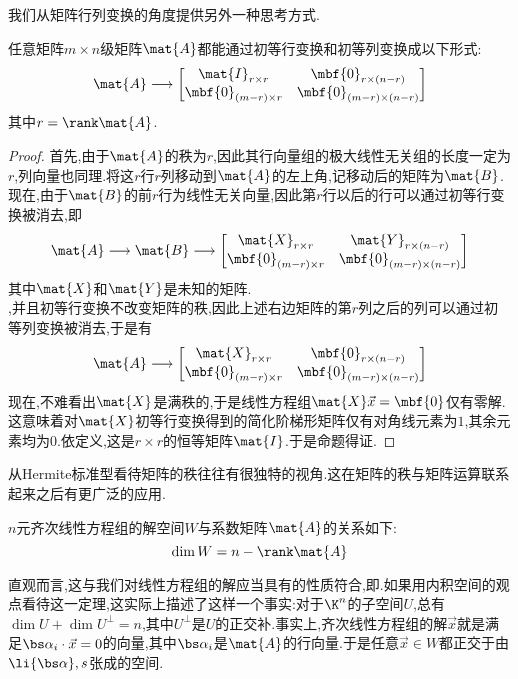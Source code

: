 \documentclass{ctexart}
\begin{document}
{\color{darkgreen}我们从矩阵行列变换的角度提供另外一种思考方式.
\begin{definition}[Hermite标准型]
    任意矩阵$m\times n$级矩阵$\mat{A}$都能通过初等行变换和初等列变换成以下形式:
    \[\mat{A}\longrightarrow\begin{bmatrix}
        \mat{I}_{r\times r}&\mbf{0}_{r\times(n-r)}\\
        \mbf{0}_{(m-r)\times r}&\mbf{0}_{(m-r)\times(n-r)}
    \end{bmatrix}\]
    其中$r=\rank\mat{A}$.
\end{definition}
\begin{proof}
    首先,由于$\mat{A}$的秩为$r$,因此其行向量组的极大线性无关组的长度一定为$r$,列向量也同理.将这$r$行$r$列移动到$\mat{A}$的左上角,记移动后的矩阵为$\mat{B}$.\\
    现在,由于$\mat{B}$的前$r$行为线性无关向量,因此第$r$行以后的行可以通过初等行变换被消去,即
    \[\mat{A}\longrightarrow\mat{B}\longrightarrow\begin{bmatrix}
        \mat{X}_{r\times r}&\mat{Y}_{r\times(n-r)}\\
        \mbf{0}_{(m-r)\times r}&\mbf{0}_{(m-r)\times(n-r)}
    \end{bmatrix}\]
    其中$\mat{X}$和$\mat{Y}$是未知的矩阵.\\
    ,并且初等行变换不改变矩阵的秩,因此上述右边矩阵的第$r$列之后的列可以通过初等列变换被消去,于是有
    \[\mat{A}\longrightarrow\begin{bmatrix}
        \mat{X}_{r\times r}&\mbf{0}_{r\times(n-r)}\\
        \mbf{0}_{(m-r)\times r}&\mbf{0}_{(m-r)\times(n-r)}
    \end{bmatrix}\]
    现在,不难看出$\mat{X}$是满秩的,于是线性方程组$\mat{X}\vec{x}=\mbf{0}$仅有零解.这意味着对$\mat{X}$初等行变换得到的简化阶梯形矩阵仅有对角线元素为$1$,其余元素均为$0$.依定义,这是$r\times r$的恒等矩阵$\mat{I}$.于是命题得证.
\end{proof}
从Hermite标准型看待矩阵的秩往往有很独特的视角.这在矩阵的秩与矩阵运算联系起来之后有更广泛的应用.}
\begin{theorem}[解空间的维数和系数矩阵的秩的关系]
    $n$元齐次线性方程组的解空间$W$与系数矩阵$\mat{A}$的关系如下:
    \[\dim W=n-\rank\mat{A}\]
\end{theorem}
{\color{darkgreen}直观而言,这与我们对线性方程组的解应当具有的性质符合,即.如果用内积空间的观点看待这一定理,这实际上描述了这样一个事实:对于$\K^n$的子空间$U$,总有$\dim U+\dim U^\bot=n$,其中$U^\bot$是$U$的正交补.事实上,齐次线性方程组的解$\vec{x}$就是满足$\bs\alpha_i\cdot\vec{x}=0$的向量,其中$\bs\alpha_i$是$\mat{A}$的行向量.于是任意$\vec{x}\in W$都正交于由$\li{\bs\alpha},s$张成的空间.}\\
\end{document}
